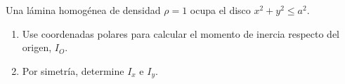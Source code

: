 Una lámina homogénea de densidad $\rho=1$ ocupa el disco $x^2+y^2\leq a^2$.
\begin{enumerate}
    \item Use coordenadas polares para calcular el momento de inercia respecto del origen, $I_O$.
    \item Por simetría, determine $I_x$ e $I_y$.
\end{enumerate}
